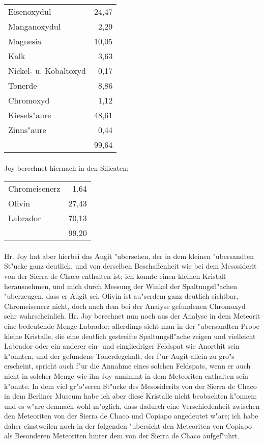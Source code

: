 \documentclass[a4paper, 11pt, oneside]{article}
\begin{document}
\begin{center}
\begin{tabular}{ l r }
    Eisenoxydul & 24,47\\
    Manganoxydul & 2,29\\
    Magnesia & 10,05\\
    Kalk & 3,63\\
    Nickel- u. Kobaltoxyd & 0,17\\
    Tonerde & 8,86\\
    Chromoxyd & 1,12\\
    Kiesels"aure & 48,61\\
    Zinns"aure & 0,44\\
     & 99,64\\
\end{tabular}
\end{center}
\paragraph{}
Joy berechnet hiernach in den Silicaten:
\begin{center}
\begin{tabular}{ l r }
    Chromeisenerz & 1,64\\
    Olivin & 27,43\\
    Labrador & 70,13\\
     & 99,20\\
\end{tabular}
\end{center}
\paragraph{}
Hr. Joy hat aber hierbei das Augit "ubersehen, der in dem kleinen "ubersandten St"ucke ganz deutlich, und von derselben Beschaffenheit wie bei dem Mesosiderit von der Sierra de Chaco enthalten ist; ich konnte einen kleinen Kristall herausnehmen, und mich durch Messung der Winkel der Spaltungsfl"achen "uberzeugen, dass er Augit sei. Olivin ist au"serdem ganz deutlich sichtbar, Chromeisenerz nicht, doch nach dem bei der Analyse gefundenen Chromoxyd sehr wahrscheinlich. Hr. Joy berechnet nun noch aus der Analyse in dem Meteorit eine bedeutende Menge Labrador; allerdings sieht man in der "ubersandten Probe kleine Kristalle, die eine deutlich gestreifte Spaltungsfl"ache zeigen und vielleicht Labrador oder ein anderer ein- und eingliedriger Feldspat wie Anorthit sein k"onnten, und der gefundene Tonerdegehalt, der f"ur Augit allein zu gro"s erscheint, spricht auch f"ur die Annahme eines solchen Feldspats, wenn er auch nicht in solcher Menge wie ihn Joy annimmt in dem Meteoriten enthalten sein k"onnte. In dem viel gr"o"seren St"ucke des Mesosiderits von der Sierra de Chaco in dem Berliner Museum habe ich aber diese Kristalle nicht beobachten k"onnen; und es w"are demnach wohl m"oglich, dass dadurch eine Verschiedenheit zwischen den Meteoriten von der Sierra de Chaco und Copiapo angedeutet w"are; ich habe daher einstweilen noch in der folgenden "ubersicht den Meteoriten von Copiapo als Besonderen Meteoriten hinter dem von der Sierra de Chaco aufgef"uhrt.
\end{document}
